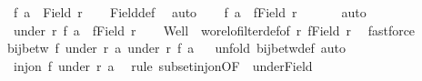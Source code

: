 \begin{isabellebody}
\ {}{\isacharcolon}{\kern0pt}\ {\isachardoublequoteopen}f\ a\ {\isasymin}\ Field\ r{\isacharprime}{\kern0pt}{\isachardoublequoteclose}\isanewline
\ \ \isamarkupfalse%
\ Field{\isacharunderscore}{\kern0pt}def\ \isamarkupfalse%
\ auto\isanewline
\ \ \isamarkupfalse%
\ {\isachardoublequoteopen}f\ a\ {\isasymin}\ f{\isacharbackquote}{\kern0pt}{\isacharparenleft}{\kern0pt}Field\ r{\isacharparenright}{\kern0pt}{\isachardoublequoteclose}\isanewline
\ \ \isamarkupfalse%
\ {\isacharasterisk}{\kern0pt}{\isacharasterisk}{\kern0pt}{\isacharasterisk}{\kern0pt}{\isacharasterisk}{\kern0pt}\ \isamarkupfalse%
\ auto\isanewline
\ \ \isamarkupfalse%
\ {}{\isacharcolon}{\kern0pt}\ {\isachardoublequoteopen}under\ r{\isacharprime}{\kern0pt}\ {\isacharparenleft}{\kern0pt}f\ a{\isacharparenright}{\kern0pt}\ {\isasymle}\ f{\isacharbackquote}{\kern0pt}{\isacharparenleft}{\kern0pt}Field\ r{\isacharparenright}{\kern0pt}{\isachardoublequoteclose}\isanewline
\ \ \isamarkupfalse%
\ Well{\isacharprime}{\kern0pt}\ {\isacharasterisk}{\kern0pt}{\isacharasterisk}{\kern0pt}{\isacharasterisk}{\kern0pt}\ wo{\isacharunderscore}{\kern0pt}rel{\isachardot}{\kern0pt}ofilter{\isacharunderscore}{\kern0pt}def{\isacharbrackleft}{\kern0pt}of\ r{\isacharprime}{\kern0pt}\ {\isachardoublequoteopen}f{\isacharbackquote}{\kern0pt}{\isacharparenleft}{\kern0pt}Field\ r{\isacharparenright}{\kern0pt}{\isachardoublequoteclose}{\isacharbrackright}{\kern0pt}\ \isamarkupfalse%
\ fastforce\isanewline
\ \ \isanewline
\ \ \isamarkupfalse%
\ {\isachardoublequoteopen}bij{\isacharunderscore}{\kern0pt}betw\ f\ {\isacharparenleft}{\kern0pt}under\ r\ a{\isacharparenright}{\kern0pt}\ {\isacharparenleft}{\kern0pt}under\ r{\isacharprime}{\kern0pt}\ {\isacharparenleft}{\kern0pt}f\ a{\isacharparenright}{\kern0pt}{\isacharparenright}{\kern0pt}{\isachardoublequoteclose}\isanewline
\ \ \isamarkupfalse%
{\isacharparenleft}{\kern0pt}unfold\ bij{\isacharunderscore}{\kern0pt}betw{\isacharunderscore}{\kern0pt}def{\isacharcomma}{\kern0pt}\ auto{\isacharparenright}{\kern0pt}\isanewline
\ \ \ \ \isamarkupfalse%
\ \ {\isachardoublequoteopen}inj{\isacharunderscore}{\kern0pt}on\ f\ {\isacharparenleft}{\kern0pt}under\ r\ a{\isacharparenright}{\kern0pt}{\isachardoublequoteclose}\ \isamarkupfalse%
\ {\isacharparenleft}{\kern0pt}rule\ subset{\isacharunderscore}{\kern0pt}inj{\isacharunderscore}{\kern0pt}on{\isacharbrackleft}{\kern0pt}OF\ {\isacharasterisk}{\kern0pt}\ under{\isacharunderscore}{\kern0pt}Field{\isacharbrackright}{\kern0pt}{\isacharparenright}{\kern0pt}\isanewline

\end{isabellebody}

